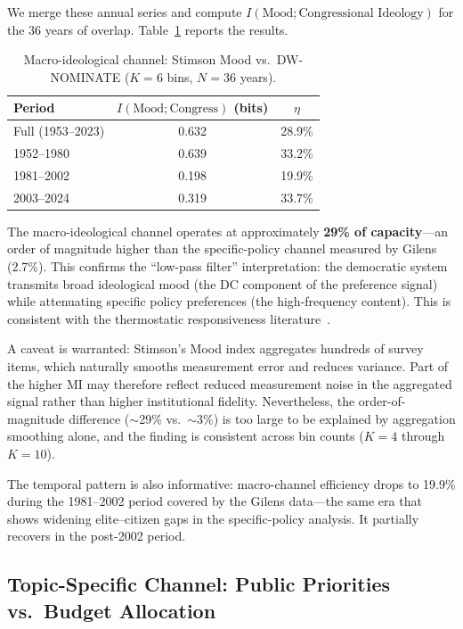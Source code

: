 \documentclass[twocolumn,10pt]{article}
\begin{document}
We merge these annual series and compute $I(\text{Mood}; \text{Congressional Ideology})$ for the 36 years of overlap.  Table~\ref{tab:stimson} reports the results.

\begin{table}[t]
\centering
\caption{Macro-ideological channel: Stimson Mood vs.\ DW-NOMINATE ($K=6$ bins, $N=36$ years).}
\label{tab:stimson}
\begin{tabular}{@{}lcc@{}}
\toprule
Period & $I(\text{Mood}; \text{Congress})$ (bits) & $\eta$ \\
\midrule
Full (1953--2023) & 0.632 & 28.9\% \\
\midrule
1952--1980 & 0.639 & 33.2\% \\
1981--2002 & 0.198 & 19.9\% \\
2003--2024 & 0.319 & 33.7\% \\
\bottomrule
\end{tabular}
\end{table}

The macro-ideological channel operates at approximately \textbf{29\% of capacity}---an order of magnitude higher than the specific-policy channel measured by Gilens (2.7\%).  This confirms the ``low-pass filter'' interpretation: the democratic system transmits broad ideological mood (the DC component of the preference signal) while attenuating specific policy preferences (the high-frequency content).  This is consistent with the thermostatic responsiveness literature~\citep{soroka2010}.

A caveat is warranted: Stimson's Mood index aggregates hundreds of survey items, which naturally smooths measurement error and reduces variance.  Part of the higher MI may therefore reflect reduced measurement noise in the aggregated signal rather than higher institutional fidelity.  Nevertheless, the order-of-magnitude difference ($\sim$29\% vs.\ $\sim$3\%) is too large to be explained by aggregation smoothing alone, and the finding is consistent across bin counts ($K{=}4$ through $K{=}10$).

The temporal pattern is also informative: macro-channel efficiency drops to 19.9\% during the 1981--2002 period covered by the Gilens data---the same era that shows widening elite--citizen gaps in the specific-policy analysis.  It partially recovers in the post-2002 period.

\subsection{Topic-Specific Channel: Public Priorities vs.\ Budget Allocation}
\end{document}
